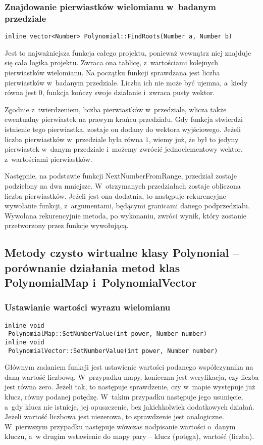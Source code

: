 \subsubsection{Znajdowanie pierwiastków wielomianu w~badanym przedziale}
\begin{lstlisting}
inline vector<Number> Polynomial::FindRoots(Number a, Number b)
\end{lstlisting}

Jest to najważniejsza funkcja całego projektu, ponieważ wewnątrz niej znajduje się cała logika projektu. Zwraca ona tablicę, z~wartościami kolejnych pierwiastków wielomianu. Na początku funkcji sprawdzana jest liczba pierwiastków w~badanym przedziale. Liczba ich nie może być ujemna, a~kiedy równa jest $0$, funkcja kończy swoje działanie i~zwraca pusty wektor.

Zgodnie z~twierdzeniem, liczba pierwiastków w~przedziale, wlicza także ewentualny pierwiastek na prawym krańcu przedziału. Gdy funkcja stwierdzi istnienie tego pierwiastka, zostaje on dodany do wektora wyjściowego. Jeżeli liczba pierwiastków w~przedziale była równa $1$, wiemy już, że był to jedyny pierwiastek w~danym przedziale i~możemy zwrócić jednoelementowy wektor, z~wartościami pierwiastków.

Następnie, na podstawie funkcji NextNumberFromRange, przedział zostaje podzielony na dwa mniejsze. W~otrzymanych przedziałach zostaje obliczona liczba pierwiastków. Jeżeli jest ona dodatnia, to następuje rekurencyjne wywołanie funkcji, z~argumentami, będącymi granicami danego podprzedziału. Wywołana rekurencyjnie metoda, po wykonaniu, zwróci wynik, który zostanie przetworzony przez funkcje wywołującą. 

\subsection{Metody czysto wirtualne klasy Polynonial – porównanie działania metod klas PolynomialMap i~PolynomialVector}

\subsubsection{Ustawianie wartości wyrazu wielomianu}
\begin{lstlisting}
inline void
 PolynomialMap::SetNumberValue(int power, Number number)
inline void
 PolynomialVector::SetNumberValue(int power, Number number)
\end{lstlisting}

Głównym zadaniem funkcji jest ustawienie wartości podanego współczynnika na daną wartość liczbową. W~przypadku mapy, konieczna jest weryfikacja, czy liczba jest równa zero. Jeżeli tak, to następuje sprawdzenie, czy w~mapie występuje już klucz, równy podanej potędzę. W~takim przypadku następuje jego usunięcie, a~gdy klucz nie istnieje, jej opuszczenie, bez jakichkolwiek dodatkowych działań. Jeżeli wartość liczbowa jest niezerowa, to sprawdzenie jest analogiczne. W~pierwszym przypadku następuje wówczas nadpisanie wartości o~danym kluczu, a~w drugim wstawienie do mapy pary – klucz (potęga), wartość (liczba).


